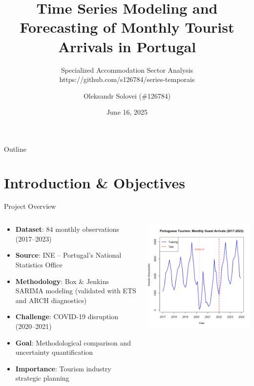 \documentclass[10pt]{beamer}
\title[Portuguese Tourism Forecasting]{Time Series Modeling and Forecasting of Monthly Tourist Arrivals in Portugal}
\subtitle{Specialized Accommodation Sector Analysis\\https://github.com/s126784/series-temporais}
\author{Oleksandr Solovei (\#126784)}
\date{June 16, 2025}
\begin{document}
\begin{frame}
\titlepage
\end{frame}

\begin{frame}{Outline}
\tableofcontents
\end{frame}

\section{Introduction \& Objectives}

\begin{frame}{Project Overview}
\begin{columns}
\begin{column}{0.55\textwidth}
\begin{itemize}
\item \textbf{Dataset}: 84 monthly observations (2017--2023)
\item \textbf{Source}: INE -- Portugal's National Statistics Office
\item \textbf{Methodology}: Box \& Jenkins SARIMA modeling (validated with ETS and ARCH diagnostics)
\item \textbf{Challenge}: COVID-19 disruption (2020--2021)
\item \textbf{Goal}: Methodological comparison and uncertainty quantification
\item \textbf{Importance}: Tourism industry strategic planning
\end{itemize}

\end{column}

\begin{column}{0.45\textwidth}
\includegraphics[width=\textwidth,keepaspectratio]{plots/monthly-guest-arrivals.png}
\end{column}
\end{columns}
\end{frame}
\end{document}
